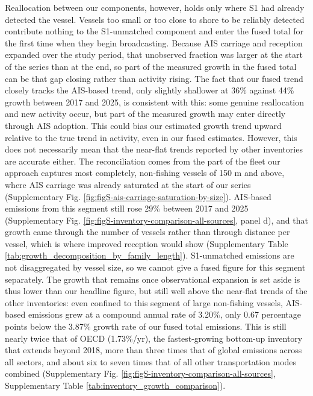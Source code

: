 Reallocation between our components, however, holds only where S1 had already detected the vessel. Vessels too small or too close to shore to be reliably detected contribute nothing to the S1-unmatched component and enter the fused total for the first time when they begin broadcasting. Because AIS carriage and reception expanded over the study period, that unobserved fraction was larger at the start of the series than at the end, so part of the measured growth in the fused total can be that gap closing rather than activity rising. The fact that our fused trend closely tracks the AIS-based trend, only slightly shallower at 36\% against 44\% growth between 2017 and 2025, is consistent with this: some genuine reallocation and new activity occur, but part of the measured growth may enter directly through AIS adoption. This could bias our estimated growth trend upward relative to the true trend in activity, even in our fused estimates. However, this does not necessarily mean that the near-flat trends reported by other inventories are accurate either. The reconciliation comes from the part of the fleet our approach captures most completely, non-fishing vessels of 150 m and above, where AIS carriage was already saturated at the start of our series (Supplementary Fig. \ref{fig:figS-ais-carriage-saturation-by-size}). AIS-based emissions from this segment still rose 29\% between 2017 and 2025 (Supplementary Fig. \ref{fig:figS-inventory-comparison-all-sources}, panel d), and that growth came through the number of vessels rather than through distance per vessel, which is where improved reception would show (Supplementary Table \ref{tab:growth_decomposition_by_family_length}). S1-unmatched emissions are not disaggregated by vessel size, so we cannot give a fused figure for this segment separately. The growth that remains once observational expansion is set aside is thus lower than our headline figure, but still well above the near-flat trends of the other inventories: even confined to this segment of large non-fishing vessels, AIS-based emissions grew at a compound annual rate of 3.20\%, only 0.67 percentage points below the 3.87\% growth rate of our fused total emissions. This is still nearly twice that of OECD (1.73\%/yr), the fastest-growing bottom-up inventory that extends beyond 2018, more than three times that of global emissions across all sectors, and about six to seven times that of all other transportation modes combined (Supplementary Fig. \ref{fig:figS-inventory-comparison-all-sources}, Supplementary Table \ref{tab:inventory_growth_comparison}).
